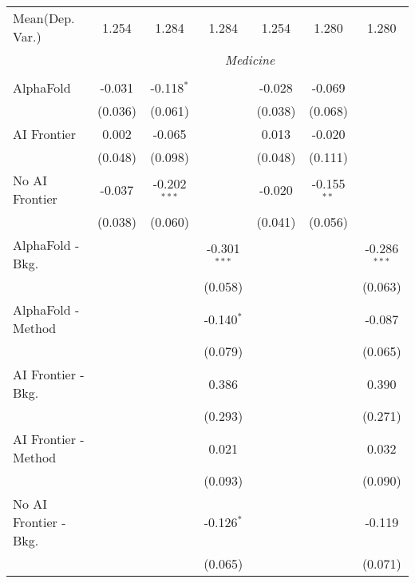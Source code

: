 \begin{tabular}{lcccccc}
Mean(Dep. Var.) & 1.254 & 1.284 & 1.284 & 1.254 & 1.280 & 1.280 \\
 & \multicolumn{6}{c}{\textit{Medicine}} \\ \\
   AlphaFold               & -0.031  & -0.118$^{*}$   &                & -0.028  & -0.069        &   \\   
                           & (0.036) & (0.061)        &                & (0.038) & (0.068)       &   \\   
   AI Frontier             & 0.002   & -0.065         &                & 0.013   & -0.020        &   \\   
                           & (0.048) & (0.098)        &                & (0.048) & (0.111)       &   \\   
   No AI Frontier          & -0.037  & -0.202$^{***}$ &                & -0.020  & -0.155$^{**}$ &   \\   
                           & (0.038) & (0.060)        &                & (0.041) & (0.056)       &   \\   
   AlphaFold - Bkg.        &         &                & -0.301$^{***}$ &         &               & -0.286$^{***}$\\   
                           &         &                & (0.058)        &         &               & (0.063)\\   
   AlphaFold - Method      &         &                & -0.140$^{*}$   &         &               & -0.087\\   
                           &         &                & (0.079)        &         &               & (0.065)\\   
   AI Frontier - Bkg.      &         &                & 0.386          &         &               & 0.390\\   
                           &         &                & (0.293)        &         &               & (0.271)\\   
   AI Frontier - Method    &         &                & 0.021          &         &               & 0.032\\   
                           &         &                & (0.093)        &         &               & (0.090)\\   
   No AI Frontier - Bkg.   &         &                & -0.126$^{*}$   &         &               & -0.119\\   
                           &         &                & (0.065)        &         &               & (0.071)\\   

\end{tabular}
